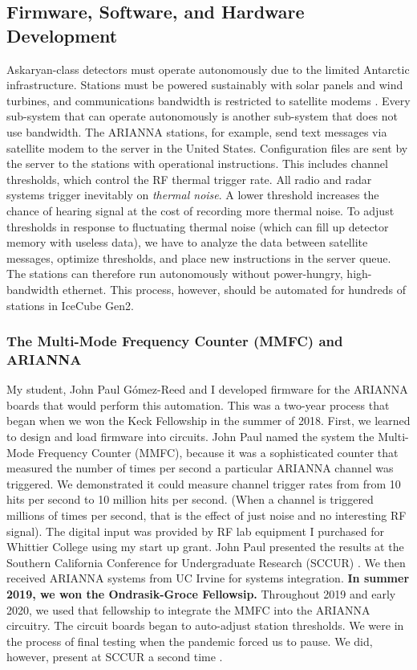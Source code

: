 \documentclass[../../../main.tex]{subfiles}
\begin{document}
\subsection{Firmware, Software, and Hardware Development}

Askaryan-class detectors must operate autonomously due to the limited Antarctic infrastructure.  Stations must be powered sustainably with solar panels and wind turbines, and communications bandwidth is restricted to satellite modems \cite{10.1109/tns.2015.2468182}.  Every sub-system that can operate autonomously is another sub-system that does not use bandwidth.  The ARIANNA stations, for example, send text messages via satellite modem to the server in the United States.  Configuration files are sent by the server to the stations with operational instructions.  This includes channel thresholds, which control the RF thermal trigger rate.  All radio and radar systems trigger inevitably on \textit{thermal noise}.  A lower threshold increases the chance of hearing signal at the cost of recording more thermal noise.  To adjust thresholds in response to fluctuating thermal noise (which can fill up detector memory with useless data), we have to analyze the data between satellite messages, optimize thresholds, and place new instructions in the server queue.  The stations can therefore run autonomously without power-hungry, high-bandwidth ethernet.  This process, however, should be automated for hundreds of stations in IceCube Gen2.

\subsubsection{The Multi-Mode Frequency Counter (MMFC) and ARIANNA}

My student, John Paul G\'{o}mez-Reed and I developed firmware for the ARIANNA boards that would perform this automation.  This was a two-year process that began when we won the Keck Fellowship in the summer of 2018. First, we learned to design and load firmware into circuits.  John Paul named the system the Multi-Mode Frequency Counter (MMFC), because it was a sophisticated counter that measured the number of times per second a particular ARIANNA channel was triggered.  We demonstrated it could measure channel trigger rates from from 10 hits per second to 10 million hits per second.  (When a channel is triggered millions of times per second, that is the effect of just noise and no interesting RF signal).  The digital input was provided by RF lab equipment I purchased for Whittier College using my start up grant. John Paul presented the results at the Southern California Conference for Undergraduate Research (SCCUR) \cite{sccur1}.  We then received ARIANNA systems from UC Irvine for systems integration.  \textbf{In summer 2019, we won the Ondrasik-Groce Fellowsip.}  Throughout 2019 and early 2020, we used that fellowship to integrate the MMFC into the ARIANNA circuitry.  The circuit boards began to auto-adjust station thresholds.  We were in the process of final testing when the pandemic forced us to pause.  We did, however, present at SCCUR a second time \cite{sccur2}.
\end{document}
